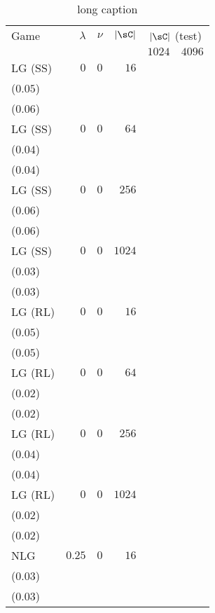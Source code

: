 \begin{table}[t]
\centering
\caption[short caption]{long caption}
\label{table:lg_imagenet_0_test_topsim_classif}
\begin{tabular}{lrrrrr}
\toprule
Game & \(\lambda\) & \(\nu\) & \(|\sC|\) & \multicolumn{2}{c}{\(|\sC|\) (test)} \\[1ex]
 &  &  &  & \multicolumn{1}{c}{\(1024\)} & \multicolumn{1}{c}{\(4096\)} \\
\midrule
LG {\scriptsize(SS)} & \(0\) & \(0\) & \(16\) & \longcell{\(0.19\)\\{\tiny(\(0.05\))}} & \longcell{\(0.20\)\\{\tiny(\(0.06\))}} \\[2.2ex]
LG {\scriptsize(SS)} & \(0\) & \(0\) & \(64\) & \longcell{\(0.21\)\\{\tiny(\(0.04\))}} & \longcell{\(0.22\)\\{\tiny(\(0.04\))}} \\[2.2ex]
LG {\scriptsize(SS)} & \(0\) & \(0\) & \(256\) & \longcell{\(0.18\)\\{\tiny(\(0.06\))}} & \longcell{\(0.19\)\\{\tiny(\(0.06\))}} \\[2.2ex]
LG {\scriptsize(SS)} & \(0\) & \(0\) & \(1024\) & \longcell{\(0.19\)\\{\tiny(\(0.03\))}} & \longcell{\(0.19\)\\{\tiny(\(0.03\))}} \\[2.2ex]
LG {\scriptsize(RL)} & \(0\) & \(0\) & \(16\) & \longcell{\(0.29\)\\{\tiny(\(0.05\))}} & \longcell{\(0.29\)\\{\tiny(\(0.05\))}} \\[2.2ex]
LG {\scriptsize(RL)} & \(0\) & \(0\) & \(64\) & \longcell{\(0.29\)\\{\tiny(\(0.02\))}} & \longcell{\(0.29\)\\{\tiny(\(0.02\))}} \\[2.2ex]
LG {\scriptsize(RL)} & \(0\) & \(0\) & \(256\) & \longcell{\(0.24\)\\{\tiny(\(0.04\))}} & \longcell{\(0.24\)\\{\tiny(\(0.04\))}} \\[2.2ex]
LG {\scriptsize(RL)} & \(0\) & \(0\) & \(1024\) & \longcell{\(0.21\)\\{\tiny(\(0.02\))}} & \longcell{\(0.21\)\\{\tiny(\(0.02\))}} \\[2.2ex]
NLG & \(0.25\) & \(0\) & \(16\) & \longcell{\(0.25\)\\{\tiny(\(0.03\))}} & \longcell{\(0.25\)\\{\tiny(\(0.03\))}} \\[2.2ex]

\end{tabular}
\end{table}
